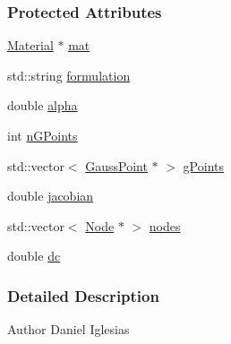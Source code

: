\subsubsection*{Protected Attributes}
\begin{DoxyCompactItemize}
\item 
\hyperlink{classmknix_1_1_material}{Material} $\ast$ \hyperlink{classmknix_1_1_cell_a83ca13ff89196b3ab378d2a28820a08e}{mat}
\item 
std\-::string \hyperlink{classmknix_1_1_cell_ad637a730575145fbc61f884b2edac8f8}{formulation}
\item 
double \hyperlink{classmknix_1_1_cell_a79afef7ecbdfee69e687bb2e7559520b}{alpha}
\item 
int \hyperlink{classmknix_1_1_cell_a7d406d6e6f58c14da07387723986ae38}{n\-G\-Points}
\item 
std\-::vector$<$ \hyperlink{classmknix_1_1_gauss_point}{Gauss\-Point} $\ast$ $>$ \hyperlink{classmknix_1_1_cell_a980ae62ad7e6dda296257455ee173f86}{g\-Points}
\item 
double \hyperlink{classmknix_1_1_cell_a4922bf34ba543606a8d9c5ca4847b589}{jacobian}
\item 
std\-::vector$<$ \hyperlink{classmknix_1_1_node}{Node} $\ast$ $>$ \hyperlink{classmknix_1_1_cell_a6afd7987e2b95a27ec9229caf2244015}{nodes}
\item 
double \hyperlink{classmknix_1_1_cell_a7108fef12b0319adebeff93cab664314}{dc}
\end{DoxyCompactItemize}


\subsubsection{Detailed Description}
\begin{DoxyAuthor}{Author}
Daniel Iglesias 
\end{DoxyAuthor}


